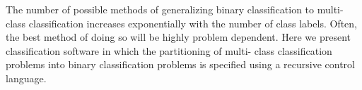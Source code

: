The number of possible methods of generalizing binary classification to 
multi-class classification increases exponentially with the number of class labels.
Often, the best method of doing so will be highly problem dependent.
Here we present classification software in which the partitioning of multi-
class classification problems into binary classification problems is
specified using a recursive control language.

